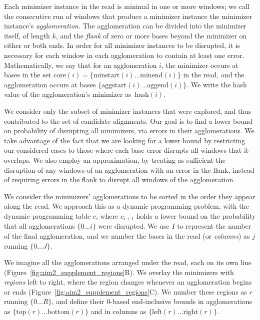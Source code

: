 \documentclass[11pt]{ucscthesis}
\newcommand{\rtop}[1]{\mathrm{top}(#1)}
\newcommand{\rbottom}[1]{\mathrm{bottom}(#1)}
\newcommand{\rleft}[1]{\mathrm{left}(#1)}
\newcommand{\rright}[1]{\mathrm{right}(#1)}
\newcommand{\minstart}[1]{\mathrm{minstart}(#1)}
\newcommand{\minend}[1]{\mathrm{minend}(#1)}
\newcommand{\core}[1]{\mathrm{core}(#1)}
\newcommand{\aggstart}[1]{\mathrm{aggstart}(#1)}
\newcommand{\aggend}[1]{\mathrm{aggend}(#1)}
\newcommand{\agghash}[1]{\mathrm{hash}(#1)}
\newcommand{\vocab}[1]{\emph{#1}}
\begin{document}
Each minimizer instance in the read is minimal in one or more windows; we call the consecutive run of windows that produce a minimizer instance the minimizer instance’s \vocab{agglomeration}. The agglomeration can be divided into the minimizer itself, of length $k$, and the \vocab{flank} of zero or more bases beyond the minimizer on either or both ends. In order for all minimizer instances to be disrupted, it is necessary for each window in each agglomeration to contain at least one error. Mathematically, we say that for an agglomeration $i$, the minimizer occurs at bases in the set $\core{i} = \{\minstart{i} \ldots \minend{i}\}$ in the read, and the agglomeration occurs at bases $\{\aggstart{i} \ldots \aggend{i}\}$. We write the hash value of the agglomeration's minimizer as~$\agghash{i}$.


We consider only the subset of minimizer instances that were explored, and thus contributed to the set of candidate alignments. Our goal is to find a lower bound on probability of disrupting all minimizers, via errors in their agglomerations. We take advantage of the fact that we are looking for a lower bound by restricting our considered cases to those where each base error disrupts all windows that it overlaps. We also employ an approximation, by treating as sufficient the disruption of any windows of an agglomeration with an error in the flank, instead of requiring errors in the flank to disrupt all windows of the agglomeration. 


We consider the minimizers' agglomerations to be sorted in the order they appear along the read. We approach this as a dynamic programming problem, with the dynamic programming table $c$, where $c_{i + 1}$ holds a lower bound on the probability that all agglomerations $\{0 \ldots i\}$ were disrupted. We use $I$ to represent the number of the final agglomeration, and we number the bases in the read (or \vocab{columns}) as $j$ running $\{0 \ldots J\}$.

We imagine all the agglomerations arranged under the read, each on its own line (Figure~\ref{fig:aim2_supplement_regions}B).
We overlay the minimizers with \vocab{regions} left to right, where the region changes whenever an agglomeration begins or ends (Figure~\ref{fig:aim2_supplement_regions}C).
We number these regions as $r$ running $\{0 \ldots R\}$, and define their 0-based end-inclusive bounds in agglomerations as $\{\rtop{r} \ldots \rbottom{r}\}$ and in columns as $\{\rleft{r} \ldots \rright{r}\}$. 


\newcommand{\Prob}[1]{P\left({#1}\right)}
\end{document}
